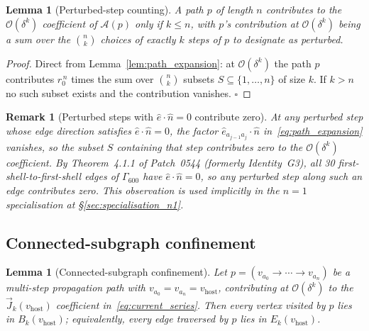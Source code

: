 \documentclass[11pt,letterpaper]{article}
\newtheorem{lemma}[theorem]{Lemma}
\newtheorem{remark}[theorem]{Remark}
\newcommand{\nhat}{\hat{n}}
\newcommand{\vhost}{v_{\text{host}}}
\newcommand{\Eorder}[1]{\mathcal{O}(\delta^{#1})}
\newcommand{\Gsixcell}{\Gamma_{600}}
\begin{document}
\begin{lemma}[Perturbed-step counting]\label{lem:perturbed_step_counting}
A path $p$ of length $n$ contributes to the $\Eorder{k}$ coefficient of $\mathcal{A}(p)$ only if $k \leq n$, with $p$'s contribution at $\Eorder{k}$ being a sum over the $\binom{n}{k}$ choices of exactly $k$ steps of $p$ to designate as perturbed.
\end{lemma}

\begin{proof}
Direct from Lemma~\ref{lem:path_expansion}: at $\Eorder{k}$ the path $p$ contributes $r_0^{\,n}$ times the sum over $\binom{n}{k}$ subsets $S \subseteq \{1,\ldots,n\}$ of size $k$. If $k > n$ no such subset exists and the contribution vanishes. $\square$
\end{proof}

\begin{remark}[Perturbed steps with $\hat{e}\cdot\nhat = 0$ contribute zero]\label{rem:zero_contributions}
At any perturbed step whose edge direction satisfies $\hat{e}\cdot\nhat = 0$, the factor $\hat{e}_{a_{j-1} a_j}\cdot\nhat$ in~\eqref{eq:path_expansion} vanishes, so the subset $S$ containing that step contributes zero to the $\Eorder{k}$ coefficient. By Theorem~4.1.1 of Patch~0544 (formerly Identity~G3), all 30 first-shell-to-first-shell edges of $\Gsixcell$ have $\hat{e}\cdot\nhat = 0$, so any perturbed step along such an edge contributes zero. This observation is used implicitly in the $n=1$ specialisation at \S\ref{sec:specialisation_n1}.
\end{remark}

\subsection{Connected-subgraph confinement}\label{sec:lemma_subgraph}

\begin{lemma}[Connected-subgraph confinement]\label{lem:subgraph_confinement}
Let $p = (v_{a_0} \to \cdots \to v_{a_n})$ be a multi-step propagation path with $v_{a_0} = v_{a_n} = \vhost$, contributing at $\Eorder{k}$ to the $\vec{J}_k(\vhost)$ coefficient in~\eqref{eq:current_series}. Then every vertex visited by $p$ lies in $B_k(\vhost)$; equivalently, every edge traversed by $p$ lies in $E_k(\vhost)$.
\end{lemma}
\end{document}
